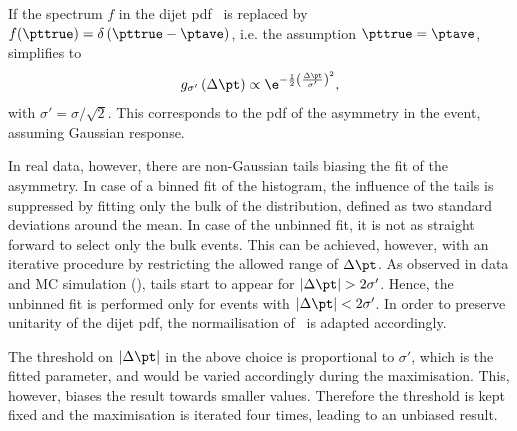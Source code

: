 If the spectrum $f$ in the dijet pdf~ is replaced by \mbox{$f(\pttrue)  = \delta\left(\pttrue - \ptave\right)$}, i.e. the assumption \mbox{$\pttrue = \ptave$}, 
 simplifies to
\begin{equation}
\label{eq:ResFit::DijetPdfTransformed:Simple}
  g_{\sigma'}\left(\Delta\pt\right) \propto
  \e^{-\frac{1}{2}\left(\frac{\Delta\pt}{\sigma'}\right)^{2}}, 
\end{equation}
with \mbox{$\sigma' = \sigma/\sqrt{2}$}.
This corresponds to the pdf of the asymmetry in the event, assuming
Gaussian response.

In real data, however, there are non-Gaussian tails biasing the fit of the asymmetry.
In case of a binned fit of the histogram, the influence of the tails is suppressed by
fitting only the bulk of the distribution, defined as two standard deviations around the mean.
In case of the unbinned fit, it is not as straight
forward to select only the bulk events.
This can be achieved, however, with an iterative procedure by restricting
the allowed range of $\Delta\pt$.
As observed in data and MC simulation (), tails start to appear for \mbox{$|\Delta\pt| > 2\sigma'$}.
Hence, the unbinned fit is performed only for events with \mbox{$|\Delta\pt| < 2\sigma'$}.
In order to preserve unitarity of the dijet pdf, the normailisation
of~ is adapted accordingly.

The threshold on $|\Delta\pt|$ in the above choice is proportional to $\sigma'$, which is the fitted parameter, and would be varied accordingly during the maximisation.
This, however, biases the result towards smaller  values.
Therefore the threshold is kept fixed and the maximisation is iterated
four times, leading to an unbiased result.


